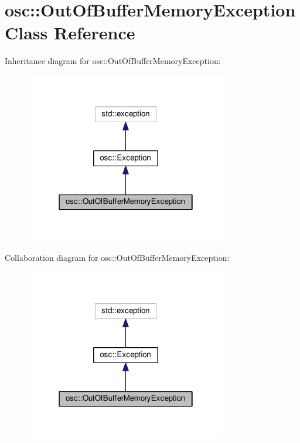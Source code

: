 \hypertarget{classosc_1_1_out_of_buffer_memory_exception}{}\section{osc\+:\+:Out\+Of\+Buffer\+Memory\+Exception Class Reference}
\label{classosc_1_1_out_of_buffer_memory_exception}


Inheritance diagram for osc\+:\+:Out\+Of\+Buffer\+Memory\+Exception\+:\nopagebreak
\begin{figure}[H]
\begin{center}
\leavevmode
\includegraphics[width=250pt]{classosc_1_1_out_of_buffer_memory_exception__inherit__graph}
\end{center}
\end{figure}


Collaboration diagram for osc\+:\+:Out\+Of\+Buffer\+Memory\+Exception\+:\nopagebreak
\begin{figure}[H]
\begin{center}
\leavevmode
\includegraphics[width=250pt]{classosc_1_1_out_of_buffer_memory_exception__coll__graph}
\end{center}
\end{figure}
